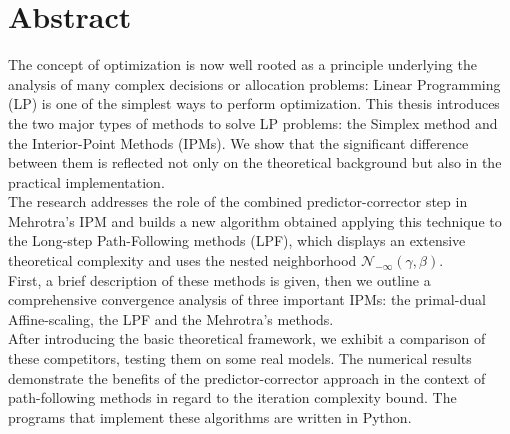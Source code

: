 \documentclass[a4paper,10 pt,titlepage,twoside]{book}
\theoremstyle{plain}
\theoremstyle{definition}
\theoremstyle{remark}
\begin{document}
\chapter*{Abstract}
The concept of optimization is now well rooted as a principle underlying the analysis
of many complex decisions or allocation problems: Linear Programming (LP) is one of the simplest ways to perform optimization.
This thesis introduces the two major types of methods to solve LP problems: the Simplex method and the Interior-Point Methods (IPMs).
We show that the significant difference between them is reflected not only on the theoretical background but also in the practical implementation.\\
The research addresses the role of the combined predictor-corrector step in Mehrotra's IPM and builds a new algorithm obtained applying this technique to the Long-step Path-Following methods (LPF), which displays an extensive theoretical complexity and uses the nested neighborhood $\mathcal{N}_{-\infty}(\gamma,\beta)$.\\
First, a brief description of these methods is given,
then we outline a comprehensive convergence analysis of three important IPMs: the primal-dual Affine-scaling, the LPF and the Mehrotra's methods. \\
After introducing the basic theoretical framework, we exhibit a comparison of these competitors, testing them on some real models. The numerical
results demonstrate the benefits of the predictor-corrector approach in the context of path-following methods in regard to the iteration complexity bound.
The programs that implement these algorithms are written in Python. 
\end{document}

